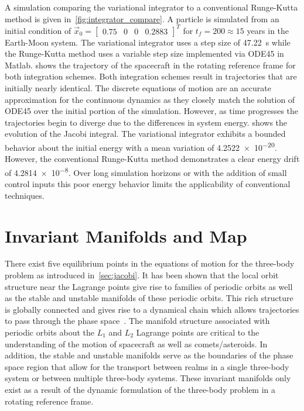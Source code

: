 \documentclass[preprint]{elsarticle}
\begin{document}
A simulation comparing the variational integrator to a conventional Runge-Kutta method is given in~\cref{fig:integrator_compare}.
A particle is simulated from an initial condition of \( \vec{x}_0 = \begin{bmatrix} 0.75 & 0 & 0 & 0.2883\end{bmatrix}^T \) for \( t_f = 200 \approx 15\) years in the Earth-Moon system.
The variational integrator uses a step size of \SI{47.22}{\second} while the Runge-Kutta method uses a variable step size implemented via ODE45 in Matlab.
 shows the trajectory of the spacecraft in the rotating reference frame for both integration schemes.
Both integration schemes result in trajectories that are initially nearly identical.
The discrete equations of motion are an accurate approximation for the continuous dynamics as they closely match the solution of ODE45 over the initial portion of the simulation.
However, as time progresses the trajectories begin to diverge due to the differences in system energy.
 shows the evolution of the Jacobi integral.
The variational integrator exhibits a bounded behavior about the initial energy with a mean variation of \num{4.2522e-20}.
However, the conventional Runge-Kutta method demonstrates a clear energy drift of \num{4.2814e-8}. 
Over long simulation horizons or with the addition of small control inputs this poor energy behavior limits the applicability of conventional techniques.

\section{Invariant Manifolds and \Poincare Map} \label{sec:invariant_manifold}


There exist five equilibrium points in the equations of motion for the three-body problem as introduced in~\cref{sec:jacobi}.
It has been shown that the local orbit structure near the Lagrange points give rise to families of periodic orbits as well as the stable and unstable manifolds of these periodic orbits.
This rich structure is globally connected and gives rise to a dynamical chain which allows trajectories to pass through the phase space~\cite{koon2000,conley1968}.
The manifold structure associated with periodic orbits about the \( L_1 \) and \( L_2 \) Lagrange points are critical to the understanding of the motion of spacecraft as well as comets/asteroids.
In addition, the stable and unstable manifolds serve as the boundaries of the phase space region that allow for the transport between realms in a single three-body system or between multiple three-body systems.
These invariant manifolds only exist as a result of the dynamic formulation of the three-body problem in a rotating reference frame. 
\end{document}

